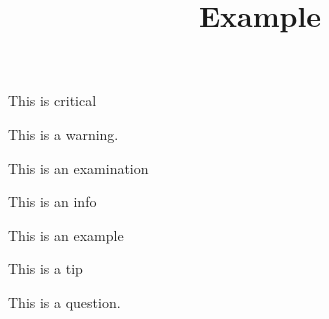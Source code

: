 \documentclass{liyua}
\title{Example}
\begin{document}
\maketitle
\begin{critical}
	This is critical
\end{critical}
\begin{warning}
	This is a warning.
\end{warning}
\begin{examination}
	This is an examination
\end{examination}
\begin{info}
	This is an info
\end{info}
\begin{example}
	This is an example
\end{example}
\begin{tip}
	This is a tip
\end{tip}
\begin{question}
	This is a question.
\end{question}
\lipsum[1-10]
\end{document}
